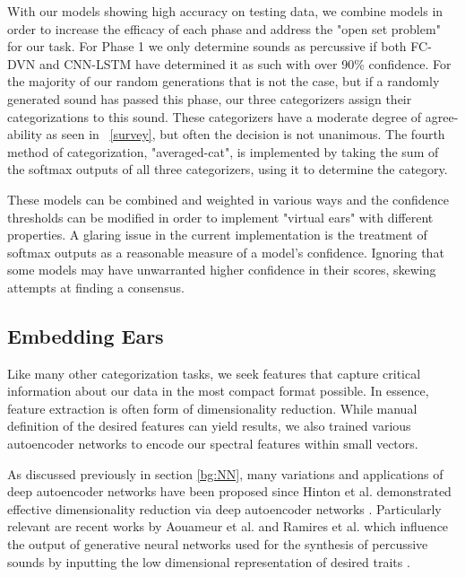 \documentclass[\main/thesis.tex]{subfiles}
\begin{document}
With our models showing high accuracy on testing data, we combine models in order to increase the efficacy of each phase and address the "open set problem" for our task. For Phase 1 we only determine sounds as percussive if both FC-DVN and CNN-LSTM have determined it as such with over 90\% confidence. For the majority of our random generations that is not the case, but if a randomly generated sound has passed this phase, our three categorizers assign their categorizations to this sound. These categorizers have a moderate degree of agree-ability as seen in ~\ref{survey}, but often the decision is not unanimous. The fourth method of categorization, "averaged-cat", is implemented by taking the sum of the softmax outputs of all three categorizers, using it to determine the category. 

These models can be combined and weighted in various ways and the confidence thresholds can be modified in order to implement "virtual ears" with different properties. A glaring issue in the current implementation is the treatment of softmax outputs as a reasonable measure of a model's confidence. Ignoring that some models may have unwarranted higher confidence in their scores, skewing attempts at finding a consensus. 


\subsection{Embedding Ears}
% 
Like many other categorization tasks, we seek features that capture critical information about our data in the most compact format possible. In essence, feature extraction is often form of dimensionality reduction. While manual definition of the desired features can yield results, we also trained various autoencoder networks to encode our spectral features within small vectors. 

As discussed previously in section \ref{bg:NN}, many variations and applications of deep autoencoder networks have been proposed since Hinton et al. demonstrated effective dimensionality reduction via deep autoencoder networks \cite{hinton1994autoencoders,hinton2006reducing}. Particularly relevant are recent works by Aouameur et al. and Ramires et al. which influence the output of generative neural networks used for the synthesis of percussive sounds by inputting the low dimensional representation of desired traits \cite{aouameur2019neural,ramires2020neural}. 
\end{document}
